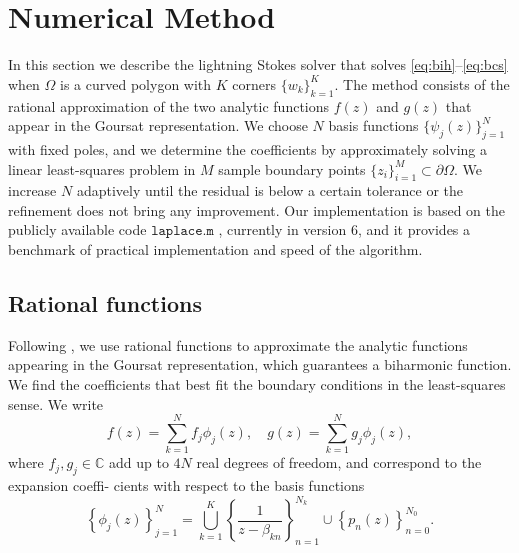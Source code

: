 
\section{Numerical Method \label{sec:method}}
In this section we describe the lightning Stokes solver that solves \eqref{eq:bih}--\eqref{eq:bcs} when $\Omega$ is a curved polygon with $K$ corners $\{w_k\}_{k=1}^K$. The method consists of the rational approximation of the two analytic functions $f(z)$ and $g(z)$ that appear in the Goursat representation. We choose $N$ basis functions $\{\psi_j(z)\}_{j=1}^N$ with fixed poles, and we determine the coefficients by approximately solving a linear least-squares problem in $M$ sample boundary points $\{z_i\}_{i=1}^M \subset \partial\Omega$. We increase $N$ adaptively until the residual is below a certain tolerance or the refinement does not bring any improvement. Our implementation is based on the publicly available code $\texttt{laplace.m}$ \cite{tref20}, currently in version 6, and it provides a benchmark of practical implementation and speed of the algorithm.


\subsection{Rational functions}
Following \cite{gopal19}, we use rational functions to approximate the analytic functions appearing in the
Goursat representation, which guarantees a biharmonic function. We find the coefficients that
best fit the boundary conditions in the least-squares sense. We write
\begin{equation}
f(z) = \sum_{k=1}^N f_j \phi_j(z), \quad g(z) = \sum_{k=1}^N g_j \phi_j(z),
\end{equation}
where $f_j, g_j\in \mathbb{C}$ add up to $4N$ real degrees of freedom, and correspond to the expansion coeffi- cients with respect to the basis functions
\begin{equation}
\left\{\phi_j(z)\right\}_{j=1}^{N} =  \bigcup_{k=1}^K\left\{\frac{1}{z-\beta_{kn}}\right\}_{n=1}^{N_k} \cup \left\{p_n(z)\right\}_{n=0}^{N_0}.
\end{equation}

